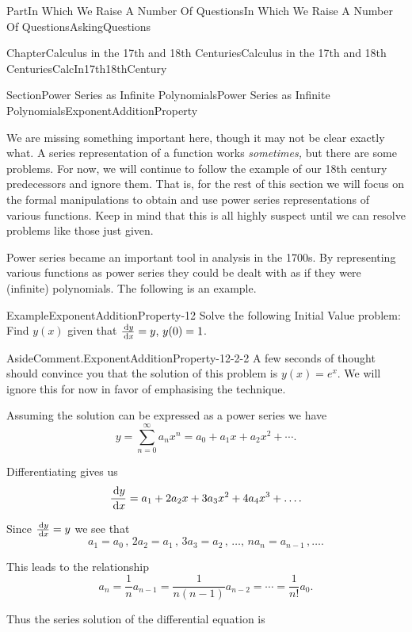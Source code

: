 \documentclass[oneside,10pt,]{book}
\numberwithin{equation}{part}
\newcommand{\dx}[1]{\,{\rm d}#1}
\begin{document}
\begin{partptx}{Part}{In Which We Raise A Number Of Questions}{}{In Which We Raise A Number Of Questions}{}{}{AskingQuestions}
\begin{chapterptx}{Chapter}{Calculus in the 17th and 18th Centuries}{}{Calculus in the 17th and 18th Centuries}{}{}{CalcIn17th18thCentury}
\begin{sectionptx}{Section}{Power Series as Infinite Polynomials}{}{Power Series as Infinite Polynomials}{}{}{ExponentAdditionProperty}
\begin{equation*}
\end{equation*}
%
\par
We are missing something important here, though it may not be clear exactly what.  A series representation of a function works \emph{sometimes,} but there are some problems.  For now, we will continue to follow the example of our 18th century predecessors and ignore them.  That is, for the rest of this section we will focus on the formal manipulations to obtain and use power series representations of various functions.  Keep in mind that this is all highly suspect until we can resolve problems like those just given.%
\par
Power series became an important tool in analysis in the 1700s.  By representing various functions as power series they could be dealt with as if they were (infinite) polynomials.  The following is an example.%
\begin{example}{Example}{}{ExponentAdditionProperty-12}%
Solve the following Initial Value problem: Find \(y(x)\) given that \(\frac{\dx{ y}}{\dx{
x}}=y,\,y(0)=1\).%
\begin{aside}{Aside}{Comment.}{ExponentAdditionProperty-12-2-2}%
A few seconds of thought should convince you that the solution of this problem is \(y(x) = e^x\).  We will ignore this for now in favor of emphasising the technique.%
\end{aside}
Assuming the solution can be expressed as a power series we have%
\begin{equation*}
y=\sum_{n=0}^\infty
a_nx^n=a_0+a_1x+a_2x^2+\cdots \text{.}
\end{equation*}
%
\par
Differentiating gives us%
\begin{equation*}
\frac{\dx{ y}}{\dx{
x}}=a_1+2a_2x+3a_3x^2+4a_4x^3+\ldots \text{.}
\end{equation*}
%
\par
Since \(\frac{\dx{ y}}{\dx{ x}}=y\) we see that%
\begin{equation*}
a_1=a_0\,,\,2a_2=a_1\,,\,3a_3=a_2\,,\,\ldots,\,na_n=a_{n-1}\,,\ldots\text{.}
\end{equation*}
%
\par
This leads to the relationship%
\begin{equation*}
a_n=\frac{1}{n}a_{n-1}=\frac{1}{n(n-1)}a_{n-2}=\cdots=\frac{1}{n!}a_0\text{.}
\end{equation*}
%
\par
Thus the series solution of the differential equation is%
\begin{equation*}

\end{equation*}
\end{example}
\end{sectionptx}
\end{chapterptx}
\end{partptx}
\end{document}
